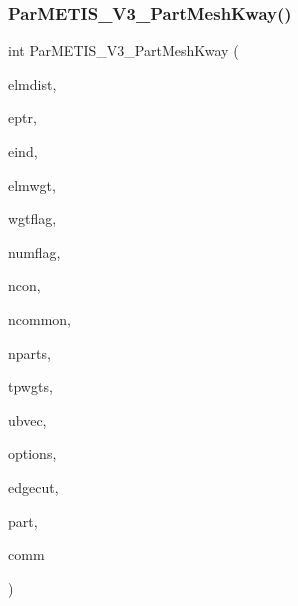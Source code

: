\subsubsection{\texorpdfstring{Par\+M\+E\+T\+I\+S\+\_\+\+V3\+\_\+\+Part\+Mesh\+Kway()}{ParMETIS\_V3\_PartMeshKway()}}
{\footnotesize\ttfamily int Par\+M\+E\+T\+I\+S\+\_\+\+V3\+\_\+\+Part\+Mesh\+Kway (\begin{DoxyParamCaption}\item[{\hyperlink{a00876_aaa5262be3e700770163401acb0150f52}{idx\+\_\+t} $\ast$}]{elmdist,  }\item[{\hyperlink{a00876_aaa5262be3e700770163401acb0150f52}{idx\+\_\+t} $\ast$}]{eptr,  }\item[{\hyperlink{a00876_aaa5262be3e700770163401acb0150f52}{idx\+\_\+t} $\ast$}]{eind,  }\item[{\hyperlink{a00876_aaa5262be3e700770163401acb0150f52}{idx\+\_\+t} $\ast$}]{elmwgt,  }\item[{\hyperlink{a00876_aaa5262be3e700770163401acb0150f52}{idx\+\_\+t} $\ast$}]{wgtflag,  }\item[{\hyperlink{a00876_aaa5262be3e700770163401acb0150f52}{idx\+\_\+t} $\ast$}]{numflag,  }\item[{\hyperlink{a00876_aaa5262be3e700770163401acb0150f52}{idx\+\_\+t} $\ast$}]{ncon,  }\item[{\hyperlink{a00876_aaa5262be3e700770163401acb0150f52}{idx\+\_\+t} $\ast$}]{ncommon,  }\item[{\hyperlink{a00876_aaa5262be3e700770163401acb0150f52}{idx\+\_\+t} $\ast$}]{nparts,  }\item[{\hyperlink{a00876_a1924a4f6907cc3833213aba1f07fcbe9}{real\+\_\+t} $\ast$}]{tpwgts,  }\item[{\hyperlink{a00876_a1924a4f6907cc3833213aba1f07fcbe9}{real\+\_\+t} $\ast$}]{ubvec,  }\item[{\hyperlink{a00876_aaa5262be3e700770163401acb0150f52}{idx\+\_\+t} $\ast$}]{options,  }\item[{\hyperlink{a00876_aaa5262be3e700770163401acb0150f52}{idx\+\_\+t} $\ast$}]{edgecut,  }\item[{\hyperlink{a00876_aaa5262be3e700770163401acb0150f52}{idx\+\_\+t} $\ast$}]{part,  }\item[{M\+P\+I\+\_\+\+Comm $\ast$}]{comm }\end{DoxyParamCaption})}

